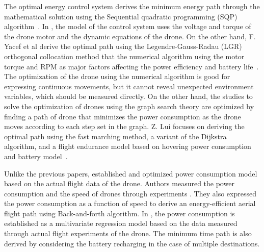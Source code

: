 \documentclass[journal]{./template/IEEEtran}
\begin{document}
The optimal energy control system derives the minimum energy path through the mathematical solution using the Sequential quadratic programming (SQP) algorithm~\cite{ref_6}. 
In \cite{ref_6}, the model of the control system uses the voltage and torque of the drone motor and the dynamic equations of the drone. 
On the other hand, F. Yacef et al derive the optimal path using the Legendre-Gauss-Radau (LGR) orthogonal collocation method that the numerical algorithm using the motor torque and RPM as major factors affecting the power efficiency and battery life~\cite{ref_7}. 
The optimization of the drone using the numerical algorithm is good for expressing continuous movements, but it cannot reveal unexpected environment variables, which should be measured directly.
On the other hand, the studies to solve the optimization of drones using the graph search theory are optimized by finding a path of drone that minimizes the power consumption as the drone moves according to each step set in the graph. 
Z. Lui focuses on deriving the optimal path using the fast marching method, a variant of the Dijkstra algorithm, and a flight endurance model based on hovering power consumption and battery model~\cite{ref_10}.

Unlike the previous papers, \cite{ref_8,ref_9} established and optimized power consumption model based on the actual flight data of the drone.
Authors measured the power consumption and the speed of drones through experiments \cite{ref_8}. They also expressed the power consumption as a function of speed to derive an energy-efficient aerial flight path using Back-and-forth algorithm.
In \cite{ref_9}, the power consumption is established as a multivariate regression model based on the data measured through actual flight experiments of the drone.
The minimum time path is also derived by considering the battery recharging in the case of multiple destinations.
\end{document}
